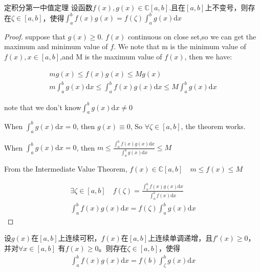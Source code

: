 \date{20.08.11}
\begin{theorem}	{定积分第一中值定理}
设函数$ f(x),g(x) \in \mathbb{C}[a,b]. $且在$ [a,b] $上不变号，则存在$ \zeta \in  [a,b]$，使得$ \int_{a}^{b}f(x)g(x) = f(\zeta)\int_{a}^bg(x)\text{d}x $

\end{theorem}
\begin{proof}
suppose that $ g(x)\ge 0 $. $ f(x) $ continuous on close set,so we can get the maximum and minimum value of $ f $. We note that m is the minimum value of $f(x), x\in [a,b] $,and M is the maximum value of $ f(x) $, then we have:

\begin{align*}
	mg(x) \leqslant f(x)g(x) \leqslant Mg(x)\\
	m\int_{a}^{b}g(x)\text{d}x \leqslant \int_{a}^{b}f(x)g(x)\text{d}x\leqslant M\int_{a}^{b}g(x)\text{d}x
\end{align*}

note that we don't know$ \int_{a}^{b}g(x)\text{d}x \neq 0$

When $ \int_{a}^{b}g(x)\text{d}x = 0$, then $ g(x) \equiv 0 $, So $ \forall \zeta \in [a,b] $, the theorem works.

When $ \int_{a}^{b}g(x)\text{d}x = 0$, then $ m\leqslant \frac{\int_{a}^{b}f(x)g(x)\text{d}x}{\int_{a}^{b}g(x)\text{d}x} \leq M $

From the Intermediate Value Theorem, $ f(x) \in \mathbb{C}[a, b] \quad m\leqslant f(x) \leqslant M $

\begin{align*}
	\exists \zeta \in [a,b] \quad f(\zeta) = \frac{\int_{a}^{b}f(x)g(x)\text{d}x}{\int_{a}^{b}f(x)\text{d}x}\\
	\int_{a}^{b}f(x)g(x)\text{d}x = f(\zeta)\int_{a}^{b}g(x)\text{d}x
\end{align*}

\end{proof}

设$ g(x) $在$ [a,b] $上连续可积，$ f(x) $在$ [a,b] $上连续单调递增，且$ f'(x) \ge 0 $，并对$ \forall x\in [a,b] $ 有$ f(x)\ge 0 $。则存在$ \zeta \in [a,b] $，使得
\begin{align*}
\int_{a}^{b}f(x)g(x)\text{d}x = f(b)\int_{\zeta}^{b}g(x)\text{d}x
\end{align*}

